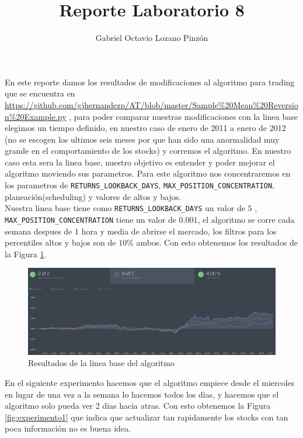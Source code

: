 \documentclass[16pt,a4paper,notitlepage,onecolumn,oneside]{article}
\title{Reporte Laboratorio 8}
\author{Gabriel Octavio Lozano Pinzón}
\begin{document}
\maketitle
En este reporte damos los resultados de modificaciones al algoritmo para trading que se encuentra en \url{https://github.com/gjhernandezp/AT/blob/master/Sample%20Mean%20Reversion%20Example.py}  
, para poder comparar nuestras modificaciones con la linea base elegimos un tiempo definido, en nuestro caso de enero de 2011 a enero de 2012 (no se escogen los ultimos seis meses por que han sido una anormalidad muy grande en el comportamiento de los stocks) y corremos el algoritmo. En nuestro caso esta sera la linea base, nuestro objetivo es entender y poder mejorar el algoritmo moviendo sus parametros.  Para este algoritmo nos concentraremos en los parametros de \verb|RETURNS_LOOKBACK_DAYS|, \verb|MAX_POSITION_CONCENTRATION|, planeación(scheduling) y valores de altos y bajos.\\

Nuestra linea base tiene como \verb|RETURNS_LOOKBACK_DAYS| un valor de $5$ , \verb|MAX_POSITION_CONCENTRATION| tiene un valor de $0.001$, el algoritmo se corre cada semana despues de 1 hora y media de abrirse el mercado, los filtros para los percentiles altos y bajos son de $10\%$ ambos. Con esto obtenemos los resultados de la Figura \ref{fig:lineabase}.

\begin{figure}[h]
	\centering
	\includegraphics[width=1.1\linewidth]{linea_base}
	\caption{Resultados de la linea base del algoritmo}
	\label{fig:lineabase}
\end{figure}

En el siguiente experimento hacemos que el algoritmo empiece desde el miercoles en lugar de una vez a la semana lo hacemos todos los dias, y hacemos que el algoritmo solo pueda ver 2 dias hacia atras. Con esto obtenemos la Figura \ref{fig:experimento1} que indica que actualizar tan rapidamente los stocks con tan poca información no es buena idea. \\
\end{document}
